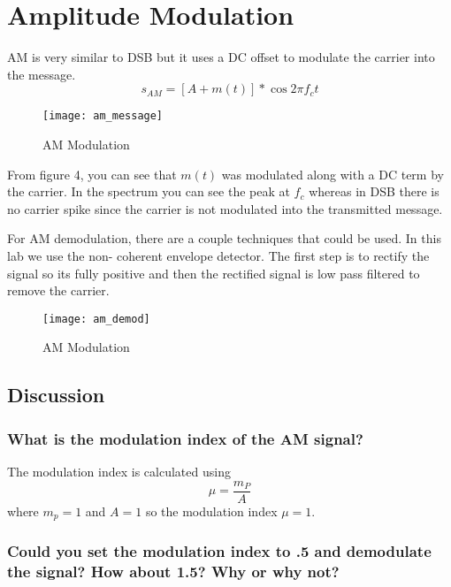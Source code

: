 \documentclass{article}
\begin{document}
    \section{Amplitude Modulation}

    AM is very similar to DSB but it uses a DC offset to modulate the carrier into the message.
    \begin{equation}
        s_{AM} = [A + m(t)]*\cos2\pi f_ct
    \end{equation}
    \begin{figure}[!htb]
        \centering
        \texttt{[image: am\_message]}
        \caption{AM Modulation}
    \end{figure}
    From figure 4, you can see that $m(t)$ was modulated along with a DC term by the carrier. In the spectrum
    you can see the peak at $f_c$ whereas in DSB there is no carrier spike since the carrier is not 
    modulated into the transmitted message. 

    For AM demodulation, there are a couple techniques that could be used. In this lab we use the non-
    coherent envelope detector. The first step is to rectify the signal so its fully positive and then 
    the rectified signal is low pass filtered to remove the carrier. 
    \begin{figure}[!htb]
        \centering
        \texttt{[image: am\_demod]}
        \caption{AM Modulation}
    \end{figure}

    \subsection{Discussion}
    \subsubsection{What is the modulation index of the AM signal?}

    The modulation index is calculated using
    \begin{equation}
        \mu = \frac{m_P}{A}
    \end{equation}
    where $m_p = 1$ and $A = 1$ so the modulation index $\mu = 1$.

    \subsubsection{Could you set the modulation index to .5 and demodulate the signal? How about
    1.5? Why or why not?}
\end{document}
